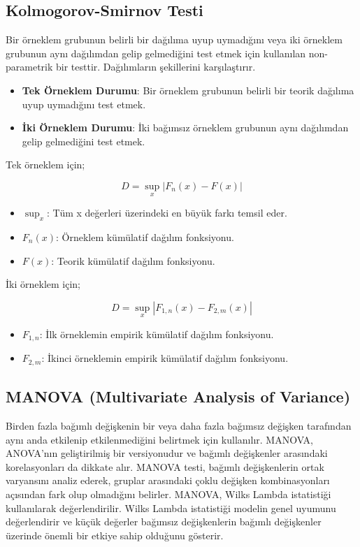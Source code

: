 \newpage

\subsection{Kolmogorov-Smirnov Testi}
Bir örneklem grubunun belirli bir dağılıma uyup uymadığını veya iki örneklem grubunun aynı dağılımdan gelip gelmediğini test etmek için kullanılan non-parametrik bir testtir. Dağılımların şekillerini karşılaştırır.

\begin{itemize}
	\item \textbf{Tek Örneklem Durumu}: Bir örneklem grubunun belirli bir teorik dağılıma uyup uymadığını test etmek.
	\item \textbf{İki Örneklem Durumu}: İki bağımsız örneklem grubunun aynı dağılımdan gelip gelmediğini test etmek.
\end{itemize}

Tek örneklem için;

\[ D = \sup_x | F_n(x) - F(x) | \]

\begin{itemize}
	\item $\sup_x$: Tüm x değerleri üzerindeki en büyük farkı temsil eder.
	\item $F_n(x)$: Örneklem kümülatif dağılım fonksiyonu.
	\item $F(x)$: Teorik kümülatif dağılım fonksiyonu.
\end{itemize}

İki örneklem için;

\[ D = \sup_x | F_{1,n}(x) - F_{2,m}(x) | \]

\begin{itemize}
	\item $F_{1,n}$: İlk örneklemin empirik kümülatif dağılım fonksiyonu.
	\item $F_{2,m}$: İkinci örneklemin empirik kümülatif dağılım fonksiyonu.
\end{itemize}

\newpage

\subsection{MANOVA (Multivariate Analysis of Variance)}
Birden fazla bağımlı değişkenin bir veya daha fazla bağımsız değişken tarafından aynı anda etkilenip etkilenmediğini belirtmek için kullanılır. MANOVA, ANOVA'nın geliştirilmiş bir versiyonudur ve bağımlı değişkenler arasındaki korelasyonları da dikkate alır. MANOVA testi, bağımlı değişkenlerin ortak varyansını analiz ederek, gruplar arasındaki çoklu değişken kombinasyonları açısından fark olup olmadığını belirler. MANOVA, Wilks Lambda istatistiği kullanılarak değerlendirilir. Wilks Lambda istatistiği modelin genel uyumunu değerlendirir ve küçük değerler bağımsız değişkenlerin bağımlı değişkenler üzerinde önemli bir etkiye sahip olduğunu gösterir.

